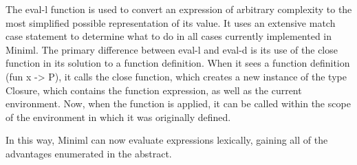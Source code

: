\documentclass[12pt,letter]{article}
\begin{document}
        The eval-l function is used to convert an expression of arbitrary complexity to the most simplified possible representation of its value. It uses an extensive match case statement to determine what to do in all cases currently implemented in Miniml. The primary difference between eval-l and eval-d is its use of the close function in its solution to a function definition. When it sees a function definition (fun x -> P), it calls the close function, which creates a new instance of the type Closure, which contains the function expression, as well as the current environment. Now, when the function is applied, it can be called within the scope of the environment in which it was originally defined. 
        
        In this way, Miniml can now evaluate expressions lexically, gaining all of the advantages enumerated in the abstract. 
\end{document}
